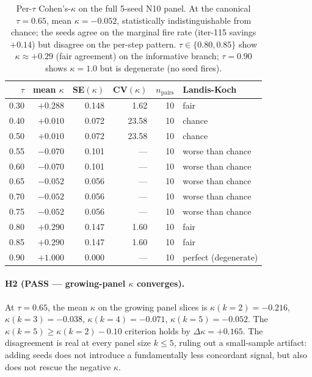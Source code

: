 \documentclass{article}
\begin{document}
\begin{table}[t]
\centering
\caption{Per-$\tau$ Cohen's-$\kappa$ on the full 5-seed N10 panel.  At
the canonical $\tau=0.65$, mean $\kappa = -0.052$, statistically
indistinguishable from chance; the seeds agree on the marginal fire
rate (iter-115 savings $+0.14$) but disagree on the per-step pattern.
$\tau \in \{0.80, 0.85\}$ show $\kappa \approx +0.29$ (fair agreement)
on the informative branch; $\tau=0.90$ shows $\kappa=1.0$ but is
degenerate (no seed fires).}
\label{tab:p7-iter143-h1}
\small
\begin{tabular}{rrrrrl}
\hline
$\tau$ & mean $\kappa$ & SE$(\kappa)$ & CV$(\kappa)$ & $n_\mathrm{pairs}$ & Landis-Koch \\
\hline
0.30 & $+0.288$ & 0.148 & 1.62 & 10 & fair \\
0.40 & $+0.010$ & 0.072 & 23.58 & 10 & chance \\
0.50 & $+0.010$ & 0.072 & 23.58 & 10 & chance \\
0.55 & $-0.070$ & 0.101 & --- & 10 & worse than chance \\
0.60 & $-0.070$ & 0.101 & --- & 10 & worse than chance \\
0.65 & $-0.052$ & 0.056 & --- & 10 & worse than chance \\
0.70 & $-0.052$ & 0.056 & --- & 10 & worse than chance \\
0.75 & $-0.052$ & 0.056 & --- & 10 & worse than chance \\
0.80 & $+0.290$ & 0.147 & 1.60 & 10 & fair \\
0.85 & $+0.290$ & 0.147 & 1.60 & 10 & fair \\
0.90 & $+1.000$ & 0.000 & --- & 10 & perfect (degenerate) \\
\hline
\end{tabular}
\end{table}

\paragraph{H2 (PASS --- growing-panel $\kappa$ converges).}
At $\tau=0.65$, the mean $\kappa$ on the growing panel slices is
$\kappa(k{=}2)=-0.216$, $\kappa(k{=}3)=-0.038$, $\kappa(k{=}4)=-0.071$,
$\kappa(k{=}5)=-0.052$. The $\kappa(k{=}5) \geq \kappa(k{=}2) - 0.10$
criterion holds by $\Delta\kappa = +0.165$. The disagreement is real at
every panel size $k \leq 5$, ruling out a small-sample artifact: adding
seeds does not introduce a fundamentally less concordant signal, but
also does not rescue the negative $\kappa$.
\end{document}
